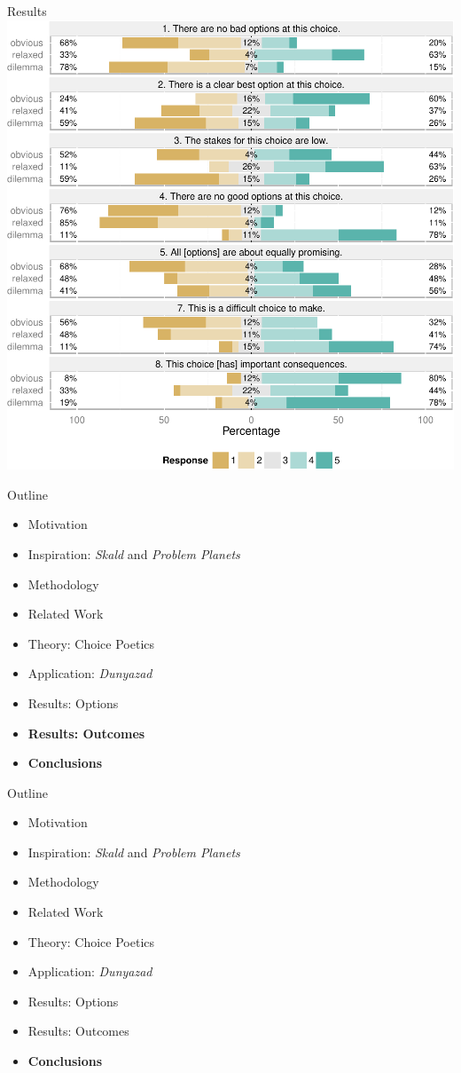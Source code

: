 \documentclass[xcolor=x11names]{beamer}
\def\dunyazad/{\textit{Dunyazad}}
\def\skald/{\textit{Skald}}
\def\problemplanets/{\textit{Problem Planets}}
\begin{document}
\begin{frame}{Results}
  \centering
  \includegraphics[height=0.85\textheight]{fig/combined-report-cropped.pdf}
\end{frame}

\begin{frame}{Outline}
  \begin{itemize}
    \item Motivation
    \item Inspiration: \skald/ and \problemplanets/
    \item Methodology
    \item Related Work
    \item Theory: Choice Poetics
    \item Application: \dunyazad/
    \item Results: Options
    \item \textbf{Results: Outcomes}
    \item \textbf{Conclusions}
  \end{itemize}
\end{frame}

\begin{frame}{Outline}
  \begin{itemize}
    \item Motivation
    \item Inspiration: \skald/ and \problemplanets/
    \item Methodology
    \item Related Work
    \item Theory: Choice Poetics
    \item Application: \dunyazad/
    \item Results: Options
    \item Results: Outcomes
    \item \textbf{Conclusions}
  \end{itemize}
\end{frame}
\end{document}
